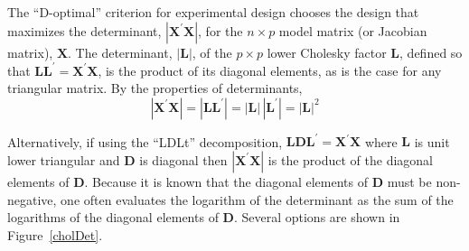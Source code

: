 \documentclass[shortnames,article]{jss}
\begin{document}
The ``D-optimal'' criterion for experimental design chooses the design
that maximizes the determinant, $|\bm X^\prime\bm X|$, for the
$n\times p$ model matrix (or Jacobian matrix), $\bm X$.  The
determinant, $|\bm L|$, of the $p\times p$ lower Cholesky factor
$\bm L$, defined so that $\bm L\bm L^\prime=\bm X^\prime\bm X$, is
the product of its diagonal elements, as is the case for any
triangular matrix.  By the properties of determinants,
\begin{displaymath}
  |\bm X^\prime\bm X|=|\bm L\bm L^\prime|=|\bm L|\,|\bm L^\prime|=|\bm L|^2
\end{displaymath}

Alternatively, if using the ``LDLt'' decomposition, $\bm L\bm D\bm
L^\prime=\bm X^\prime\bm X$ where $\bm L$ is unit lower triangular and
$\bm D$ is diagonal then $|\bm X^\prime\bm X|$ is the product of the
diagonal elements of $\bm D$.  Because it is known that the diagonal
elements of $\bm D$ must be non-negative, one often evaluates the
logarithm of the determinant as the sum of the logarithms of the
diagonal elements of $\bm D$.  Several options are shown in
Figure~\ref{cholDet}.
\end{document}
